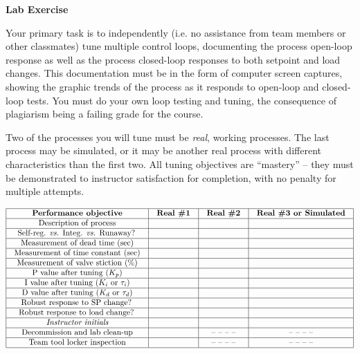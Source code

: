 




\noindent
{\bf Lab Exercise}

\vskip 5pt

Your primary task is to independently (i.e. no assistance from team members or other classmates) tune multiple control loops, documenting the process open-loop response as well as the process closed-loop responses to both setpoint and load changes.  This documentation must be in the form of computer screen captures, showing the graphic trends of the process as it responds to open-loop and closed-loop tests.  You must do your own loop testing and tuning, the consequence of plagiarism being a failing grade for the course.

Two of the processes you will tune must be {\it real}, working processes.  The last process may be simulated, or it may be another real process with different characteristics than the first two.  All tuning objectives are ``mastery'' -- they must be demonstrated to instructor satisfaction for completion, with no penalty for multiple attempts.

\vskip 10pt



$$\vbox{\offinterlineskip
\halign{\strut
\vrule \quad\hfil # \ \hfil & 
\vrule \quad\hfil # \ \hfil & 
\vrule \quad\hfil # \ \hfil & 
\vrule \quad\hfil # \ \hfil \vrule \cr
\noalign{\hrule}
%
{\bf Performance objective} & {\bf Real \#1} & {\bf Real \#2} & {\bf Real \#3 or Simulated} \cr
%
\noalign{\hrule}
%
Description of process &  &  &  \cr
%
\noalign{\hrule}
%
Self-reg. {\it vs.} Integ. {\it vs.} Runaway? &  &  &  \cr
%
\noalign{\hrule}
%
Measurement of dead time (sec) &  &  &  \cr
%
\noalign{\hrule}
%
Measurement of time constant (sec) &  &  &  \cr
%
\noalign{\hrule}
%
Measurement of valve stiction (\%) &  &  &  \cr
%
\noalign{\hrule}
%
P value after tuning ($K_p$) &  &  &  \cr
%
\noalign{\hrule}
%
I value after tuning ($K_i$ or $\tau_i$) &  &  &  \cr
%
\noalign{\hrule}
%
D value after tuning ($K_d$ or $\tau_d$) &  &  &  \cr
%
\noalign{\hrule}
%
Robust response to SP change? &  &  &  \cr
%
\noalign{\hrule}
%
Robust response to load change? &  &  &  \cr
%
\noalign{\hrule}
%
{\it Instructor initials} &  &  &  \cr
%
\noalign{\hrule}
%
Decommission and lab clean-up &  & -- -- -- -- & -- -- -- -- \cr
%
\noalign{\hrule}
%
Team tool locker inspection &  & -- -- -- -- & -- -- -- -- \cr
%
\noalign{\hrule}
} %
}$$ %

